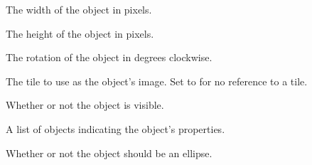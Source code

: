 \documentclass[letterpaper,10pt,english]{sphinxmanual}
\begin{document}
\begin{fulllineitems}

\begin{fulllineitems}
\label{index:tmx.Object.width}
The width of the object in pixels.

\end{fulllineitems}


\begin{fulllineitems}
\label{index:tmx.Object.height}
The height of the object in pixels.

\end{fulllineitems}


\begin{fulllineitems}
\label{index:tmx.Object.rotation}
The rotation of the object in degrees clockwise.

\end{fulllineitems}


\begin{fulllineitems}
\label{index:tmx.Object.gid}
The tile to use as the object's image.  Set to  for
no reference to a tile.

\end{fulllineitems}


\begin{fulllineitems}
\label{index:tmx.Object.visible}
Whether or not the object is visible.

\end{fulllineitems}


\begin{fulllineitems}
\label{index:tmx.Object.properties}
A list of {\hyperref[index:tmx.Property]{\emph{}}} objects indicating the object's
properties.

\end{fulllineitems}


\begin{fulllineitems}
\label{index:tmx.Object.ellipse}
Whether or not the object should be an ellipse.


\end{fulllineitems}
\end{fulllineitems}
\end{document}
